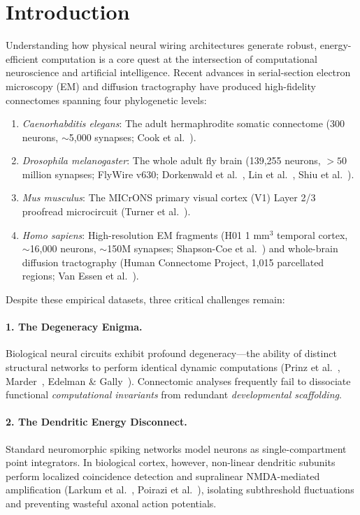 \documentclass[10pt,twocolumn,letterpaper]{article}
\begin{document}
\section{Introduction}

Understanding how physical neural wiring architectures generate robust, energy-efficient computation is a core quest at the intersection of computational neuroscience and artificial intelligence. Recent advances in serial-section electron microscopy (EM) and diffusion tractography have produced high-fidelity connectomes spanning four phylogenetic levels:
\begin{enumerate}[leftmargin=*]
    \item \textit{Caenorhabditis elegans}: The adult hermaphrodite somatic connectome (300 neurons, $\sim$5,000 synapses; Cook et al.~\cite{cook2019whole}).
    \item \textit{Drosophila melanogaster}: The whole adult fly brain (139,255 neurons, $>50$ million synapses; FlyWire v630; Dorkenwald et al.~\cite{dorkenwald2024neuronal}, Lin et al.~\cite{lin2024network}, Shiu et al.~\cite{shiu2024drosophila}).
    \item \textit{Mus musculus}: The MICrONS primary visual cortex (V1) Layer 2/3 proofread microcircuit (Turner et al.~\cite{microns2025functional}).
    \item \textit{Homo sapiens}: High-resolution EM fragments (H01 1 mm$^3$ temporal cortex, $\sim$16,000 neurons, $\sim$150M synapses; Shapson-Coe et al.~\cite{shapsoncoe2024petavoxel}) and whole-brain diffusion tractography (Human Connectome Project, 1,015 parcellated regions; Van Essen et al.~\cite{vanessen2012human}).
\end{enumerate}

Despite these empirical datasets, three critical challenges remain:

\paragraph{1. The Degeneracy Enigma.} Biological neural circuits exhibit profound degeneracy---the ability of distinct structural networks to perform identical dynamic computations (Prinz et al.~\cite{prinz2004similar}, Marder~\cite{marder2011variability}, Edelman \& Gally~\cite{edelman2001degeneracy}). Connectomic analyses frequently fail to dissociate functional \textit{computational invariants} from redundant \textit{developmental scaffolding}.

\paragraph{2. The Dendritic Energy Disconnect.} Standard neuromorphic spiking networks model neurons as single-compartment point integrators. In biological cortex, however, non-linear dendritic subunits perform localized coincidence detection and supralinear NMDA-mediated amplification (Larkum et al.~\cite{larkum1999new}, Poirazi et al.~\cite{poirazi2003pyramidal}), isolating subthreshold fluctuations and preventing wasteful axonal action potentials.
\end{document}
